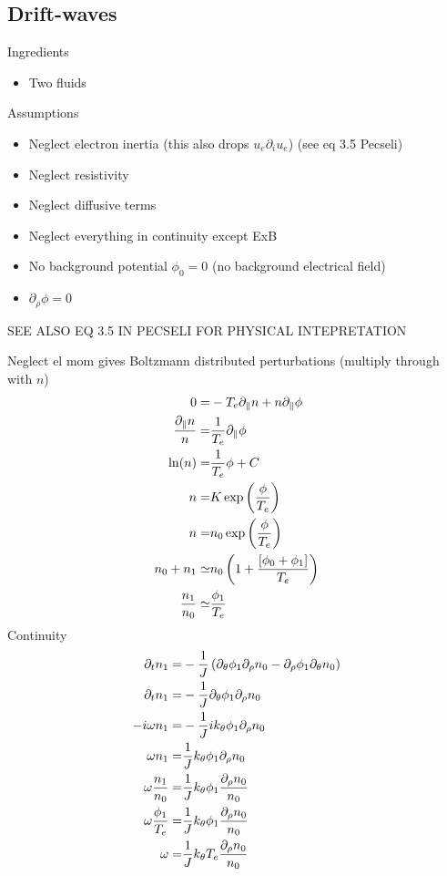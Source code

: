 \subsection{Drift-waves}
Ingredients
%
\begin{itemize}
    \item Two fluids
\end{itemize}
%
Assumptions
\begin{itemize}
    \item Neglect electron inertia (this also drops $u_e \partial_i u_e$) (see eq 3.5 Pecseli)
    \item Neglect resistivity
    \item Neglect diffusive terms
    \item Neglect everything in continuity except ExB
    \item No background potential $\phi_0 = 0$ (no background electrical field)
    \item $\partial_\rho\phi = 0$
\end{itemize}
SEE ALSO EQ 3.5 IN PECSELI FOR PHYSICAL INTEPRETATION

Neglect el mom gives Boltzmann distributed perturbations (multiply through with $n$)
\begin{align*}
    0 =& -T_e\partial_\| n + n\partial_\|\phi\\
    \frac{\partial_\| n}{n} =& \frac{1}{T_e}\partial_\|\phi\\
    \ln(n) =& \frac{1}{T_e}\phi + C\\
    n =& K\exp\left(\frac{\phi }{T_e}\right)\\
    n =& n_0\exp\left(\frac{\phi}{T_e}\right)\\
    n_0 + n_1 \simeq& n_0\left(1 + \frac{[\phi_0 + \phi_1]}{T_e}\right)\\
    \frac{n_1}{n_0} \simeq&  \frac{\phi_1}{T_e}
\end{align*}
Continuity
\begin{align*}
 \partial_t n_1
=&
 -\frac{1}{J}\left(
  \partial_\theta\phi_1\partial_\rho n_0
 - \partial_\rho\phi_1\partial_\theta n_0
 \right)
 \\
 \partial_t n_1
=&
 -\frac{1}{J}
  \partial_\theta\phi_1\partial_\rho n_0
 \\
 -i\omega n_1
=&
 -\frac{1}{J} ik_\theta\phi_1\partial_\rho n_0
 \\
 \omega n_1
=&
 \frac{1}{J} k_\theta\phi_1\partial_\rho n_0
 \\
 \omega \frac{n_1}{n_0}
=&
 \frac{1}{J} k_\theta\phi_1\frac{\partial_\rho n_0}{n_0}
 \\
 \omega \frac{\phi_1}{T_e}
=&
 \frac{1}{J} k_\theta\phi_1\frac{\partial_\rho n_0}{n_0}
 \\
 \omega
=&
 \frac{1}{J}k_\theta T_e \frac{\partial_\rho n_0}{n_0}
\end{align*}


